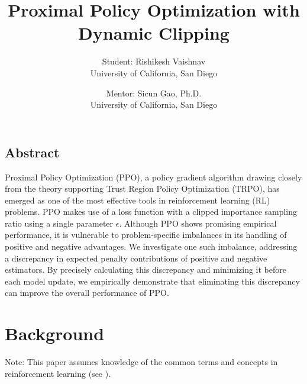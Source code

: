 \documentclass[letterpaper,twocolumn,10pt]{article}
\begin{document}
\date{}

\title{\Large \bf Proximal Policy Optimization with Dynamic Clipping}

\author{
{\rm Student: Rishikesh Vaishnav}\\
University of California, San Diego
\and
{\rm Mentor: Sicun Gao, Ph.D.}\\
University of California, San Diego
}

\maketitle

\thispagestyle{empty}

\subsection*{Abstract}
Proximal Policy Optimization (PPO), a policy gradient algorithm drawing closely
from the theory supporting Trust Region Policy Optimization (TRPO), has emerged
as one of the most effective tools in reinforcement learning (RL) problems. PPO
makes use of a loss function with a clipped importance sampling ratio using a
single parameter $\epsilon$. Although PPO shows promising empirical
performance, it is vulnerable to problem-specific imbalances in its handling of
positive and negative advantages. We investigate one such imbalance, addressing
a discrepancy in expected penalty contributions of positive and negative
estimators. By precisely calculating this discrepancy and minimizing it before
each model update, we empirically demonstrate that eliminating this discrepancy
can improve the overall performance of PPO.

\section{Background}

Note: This paper assumes knowledge of the common terms and concepts in
reinforcement learning (see \cite{DBLP:books/lib/SuttonB98}).
\end{document}
